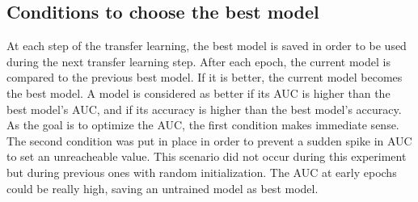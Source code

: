 \subsection{Conditions to choose the best model}
\setlength{\marginparwidth}{3cm}\leavevmode {}At each step of the transfer learning, the best model is saved in order to be used during the next transfer learning step. After each epoch, the current model is compared to the previous best model. If it is better, the current model becomes the best model. A model is considered as better if its AUC is higher than the best model's AUC, and if its accuracy is higher than the best model's accuracy. As the goal is to optimize the AUC, the first condition makes immediate sense. The second condition was put in place in order to prevent a sudden spike in AUC to set an unreacheable value. This scenario did not occur during this experiment but during previous ones with random initialization. The AUC at early epochs could be really high, saving an untrained model as best model. 


%
%


